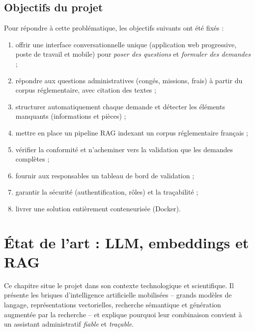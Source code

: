 \documentclass[a4paper,12pt,oneside]{report}
\begin{document}
\section{Objectifs du projet}
Pour répondre à cette problématique, les objectifs suivants ont été fixés :

\begin{enumerate}
  \item offrir une interface conversationnelle unique (application web
  progressive, poste de travail et mobile) pour \emph{poser des questions} et
  \emph{formuler des demandes} ;
  \item répondre aux questions administratives (congés, missions, frais) à partir
  du corpus réglementaire, avec citation des textes ;
  \item structurer automatiquement chaque demande et détecter les éléments
  manquants (informations et pièces) ;
  \item mettre en place un pipeline RAG indexant un corpus réglementaire français ;
  \item vérifier la conformité et n'acheminer vers la validation que les demandes
  complètes ;
  \item fournir aux responsables un tableau de bord de validation ;
  \item garantir la sécurité (authentification, rôles) et la traçabilité ;
  \item livrer une solution entièrement conteneurisée (Docker).
\end{enumerate}

\chapter{État de l'art : LLM, embeddings et RAG}

Ce chapitre situe le projet dans son contexte technologique et scientifique. Il
présente les briques d'intelligence artificielle mobilisées -- grands modèles de
langage, représentations vectorielles, recherche sémantique et génération
augmentée par la recherche -- et explique pourquoi leur combinaison convient à un
assistant administratif \emph{fiable} et \emph{traçable}.
\end{document}
